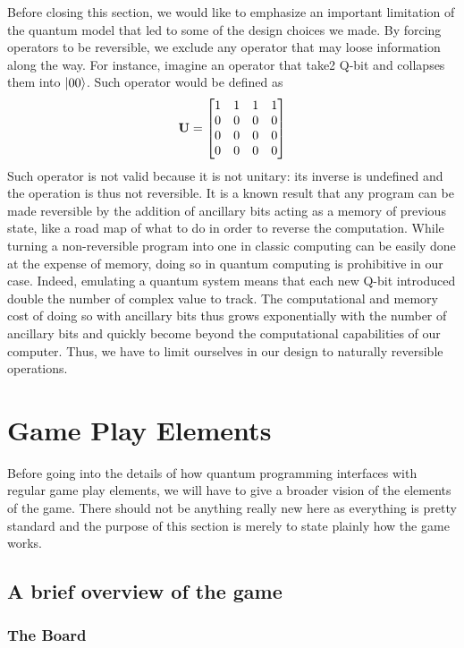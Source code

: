 \documentclass[a4paper]{article}
\begin{document}
Before closing this section, we would like to emphasize an important limitation of the quantum model that led to some of the design choices we made. By forcing operators to be reversible, we exclude any operator that may loose information along the way. For instance, imagine an operator that take2 Q-bit and collapses them into $\left| 00 \right>$. Such operator would be defined as
\[
\mathbf{U} = 
\begin{bmatrix}
1 & 1 & 1 & 1 \\
0 & 0 & 0 & 0 \\
0 & 0 & 0 & 0 \\
0 & 0 & 0 & 0
\end{bmatrix}
\]
Such operator is not valid because it is not unitary: its inverse is undefined and the operation is thus not reversible. It is a known result that any program can be made reversible by the addition of ancillary bits acting as a memory of previous state, like a road map of what to do in order to reverse the computation. While turning a non-reversible program into one in classic computing can be easily done at the expense of memory, doing so in quantum computing is prohibitive in our case. Indeed, emulating a quantum system means that each new Q-bit introduced double the number of complex value to track. The computational and memory cost of doing so with ancillary bits thus grows exponentially with the number of ancillary bits and quickly become beyond the computational capabilities of our computer. Thus, we have to limit ourselves in our design to naturally reversible operations.

\section{Game Play Elements}

Before going into the details of how quantum programming interfaces with regular game play elements, we will have to give a broader vision of the elements of the game. There should not be anything really new here as everything is pretty standard and the purpose of this section is merely to state plainly how the game works.

\subsection{A brief overview of the game}

\subsubsection{The Board}
\end{document}
